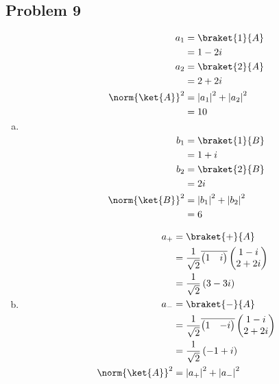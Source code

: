 \documentclass[10pt]{mypackage}
\begin{document}
\subsection{Problem 9}%
\begin{enumerate}[(a)]
  \item 
    \begin{align*}
      a_{1} &= \braket{1}{A}\\
            &= 1-2i\\
      a_{2} &= \braket{2}{A}\\
            &= 2 + 2i\\
      \norm{\ket{A}}^2 &= \left\vert a_1 \right\vert^2 + \left\vert a_2 \right\vert^2\\
                     &= 10\\
                     \\
      b_{1} &= \braket{1}{B}\\
            &= 1+i\\
      b_{2} &= \braket{2}{B}\\
            &= 2i\\
      \norm{\ket{B}}^2 &= \left\vert b_1 \right\vert^2 + \left\vert b_2 \right\vert^2\\
                       &= 6
    \end{align*}
  \item 
    \begin{align*}
      a_{+} &= \braket{+}{A}\\
            &= \frac{1}{\sqrt{2}} \overline{ \begin{pmatrix}1 & i\end{pmatrix} } \begin{pmatrix}1-i \\ 2 + 2i\end{pmatrix}\\
            &= \frac{1}{\sqrt{2}} \left(3 -3i\right)\\
      a_{-} &= \braket{-}{A}\\
            &= \frac{1}{\sqrt{2}} \overline{ \begin{pmatrix}1 & -i\end{pmatrix} } \begin{pmatrix}1-i\\2 + 2i\end{pmatrix}\\
            &= \frac{1}{\sqrt{2}} \left(-1 + i\right)\\
      \norm{\ket{A}}^2 &= \left\vert a_{+} \right\vert^2 + \left\vert a_{-} \right\vert^2\\

\end{align*}
\end{enumerate}
\end{document}
